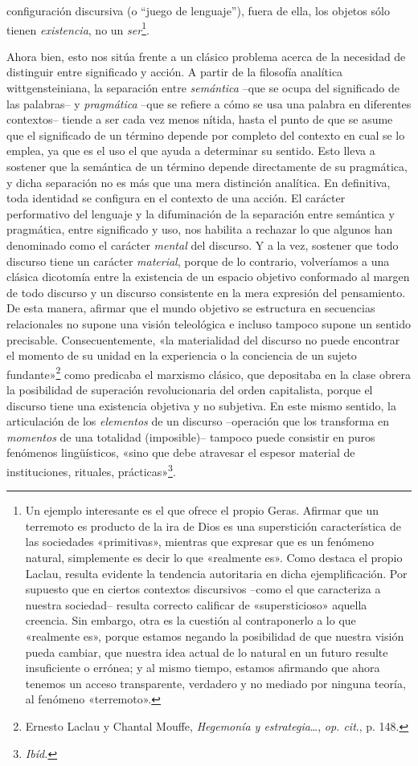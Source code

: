 configuración discursiva (o ``juego de lenguaje''), fuera de ella, los objetos sólo tienen \emph{existencia}, no un \emph{ser}\footnote{Un ejemplo interesante es el que ofrece el propio Geras. Afirmar que un terremoto es producto de la ira de Dios es una superstición característica de las sociedades «primitivas», mientras que expresar que es un fenómeno natural, simplemente es decir lo que «realmente es». Como destaca el propio Laclau, resulta evidente la tendencia autoritaria en dicha ejemplificación. Por supuesto que en ciertos contextos discursivos --como el que caracteriza a nuestra sociedad-- resulta correcto calificar de «supersticioso» aquella creencia. Sin embargo, otra es la cuestión al contraponerlo a lo que «realmente es», porque estamos negando la posibilidad de que nuestra visión pueda cambiar, que nuestra idea actual de lo natural en un futuro resulte insuficiente o errónea; y al mismo tiempo, estamos afirmando que ahora tenemos un acceso transparente, verdadero y no mediado por ninguna teoría, al fenómeno «terremoto».}.

Ahora bien, esto nos sitúa frente a un clásico problema acerca de la necesidad de distinguir entre significado y acción. A partir de la filosofía analítica wittgensteiniana, la separación entre \emph{semántica} --que se ocupa del significado de las palabras-- y \emph{pragmática} --que se refiere a cómo se usa una palabra en diferentes contextos-- tiende a ser cada vez menos nítida, hasta el punto de que se asume que el significado de un término depende por completo del contexto en cual se lo emplea, ya que es el uso el que ayuda a determinar su sentido. Esto lleva a sostener que la semántica de un término depende directamente de su pragmática, y dicha separación no es más que una mera distinción analítica. En definitiva, toda identidad se configura en el contexto de una acción. El carácter performativo del lenguaje y la difuminación de la separación entre semántica y pragmática, entre significado y uso, nos habilita a rechazar lo que algunos han denominado como el carácter \emph{mental} del discurso. Y a la vez, sostener que todo discurso tiene un carácter \emph{material}, porque de lo contrario, volveríamos a una clásica dicotomía entre la existencia de un espacio objetivo conformado al margen de todo discurso y un discurso consistente en la mera expresión del pensamiento. De esta manera, afirmar que el mundo objetivo se estructura en secuencias relacionales no supone una visión teleológica e incluso tampoco supone un sentido precisable. Consecuentemente, «la materialidad del discurso no puede encontrar el momento de su unidad en la experiencia o la conciencia de un sujeto fundante»\footnote{Ernesto Laclau y Chantal Mouffe, \emph{Hegemonía y estrategia}\ldots, \emph{op. cit}., p. 148.} como predicaba el marxismo clásico, que depositaba en la clase obrera la posibilidad de superación revolucionaria del orden capitalista, porque el discurso tiene una existencia objetiva y no subjetiva. En este mismo sentido, la articulación de los \emph{elementos} de un discurso --operación que los transforma en \emph{momentos} de una totalidad (imposible)-- tampoco puede consistir en puros fenómenos lingüísticos, «sino que debe atravesar el espesor material de instituciones, rituales, prácticas»\footnote{\emph{Ibíd.}}.

